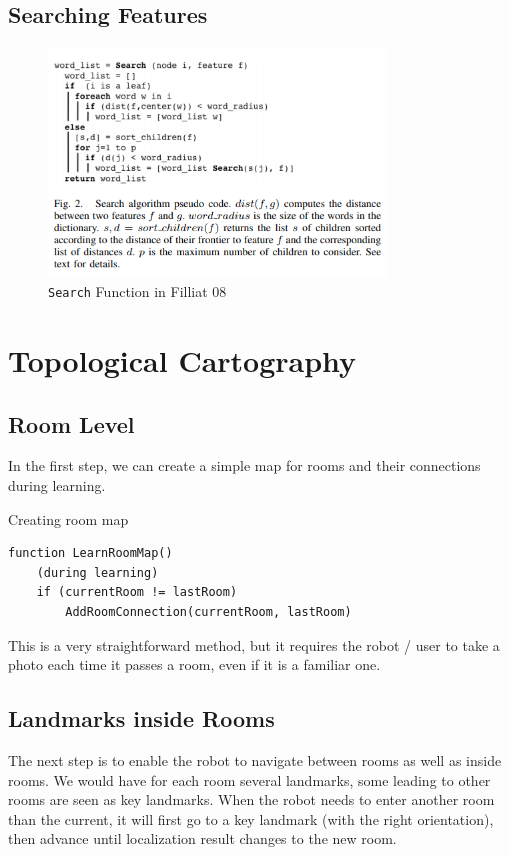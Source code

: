 \documentclass[a4paper]{scrartcl}
\newcommand{\ttt}[1]{\texttt{#1}}
\begin{document}
\subsection{Searching Features}
\begin{figure}[H]
\centering
\includegraphics[width = 0.8\textwidth]{img/search.png}
\caption{\ttt{Search} Function in Filliat 08}
\end{figure}

\newpage
\section{Topological Cartography}

\subsection{Room Level}
In the first step, we can create a simple map for rooms and their connections during learning.

\begin{listing}[H]
\caption{Creating room map}
\begin{verbatim}
function LearnRoomMap()
	(during learning)
    if (currentRoom != lastRoom)
    	AddRoomConnection(currentRoom, lastRoom)
\end{verbatim}
\end{listing}

This is a very straightforward method, but it requires the robot / user to take a photo each time it passes a room, even if it is a familiar one.

\subsection{Landmarks inside Rooms}
The next step is to enable the robot to navigate between rooms as well as inside rooms. We would have for each room several landmarks, some leading to other rooms are seen as key landmarks. When the robot needs to enter another room than the current, it will first go to a key landmark (with the right orientation), then advance until localization result changes to the new room.
\end{document}
